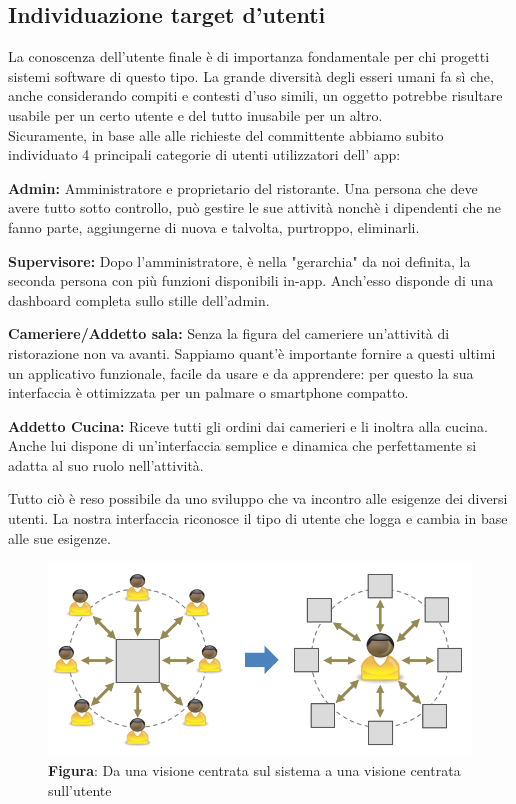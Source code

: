 \subsection{Individuazione target d'utenti}
    \begin{flushleft}
        La conoscenza dell'utente finale è di importanza fondamentale per chi progetti sistemi software di questo tipo. La grande diversità degli esseri umani
        fa sì che, anche considerando compiti e contesti d'uso simili, un oggetto potrebbe risultare usabile per un certo utente e
        del tutto inusabile per un altro.\\
        Sicuramente, in base alle alle richieste del committente abbiamo subito individuato 4 principali categorie di utenti utilizzatori dell' app:\vspace{0.5cm}
       
        \textbf{Admin:} Amministratore e proprietario del ristorante. Una persona che deve avere tutto sotto controllo, può gestire le sue attività nonchè i 
        dipendenti che ne fanno parte, aggiungerne di nuova e talvolta, purtroppo, eliminarli.\vspace{1cm}

        \textbf{Supervisore:} Dopo l'amministratore, è nella "gerarchia" da noi definita, la seconda persona con più funzioni disponibili in-app. 
        Anch'esso disponde di una dashboard completa sullo stille dell'admin.\vspace{1cm}

        \textbf{Cameriere/Addetto sala:} Senza la figura del cameriere un'attività di ristorazione non va avanti. Sappiamo quant'è importante fornire a questi ultimi
        un applicativo funzionale, facile da usare e da apprendere: per questo la sua interfaccia è ottimizzata per un palmare o smartphone compatto.\vspace{1cm}


        \textbf{Addetto Cucina:} Riceve tutti gli ordini dai camerieri e li inoltra alla cucina. Anche lui dispone di un'interfaccia semplice e dinamica che perfettamente si adatta al suo ruolo nell'attività.
        \vspace{0.5cm}

        
        
        Tutto ciò è reso possibile da uno sviluppo che va incontro alle esigenze dei diversi utenti. La nostra interfaccia riconosce il tipo di utente che logga e cambia
        in base alle sue esigenze. 

    \end{flushleft}


    \begin{figure}[H]
        \centering
        \includegraphics[scale=0.5]{assets/immagini varie/target utenti.png}
        \caption*{\textbf{Figura}: Da una visione centrata sul sistema a una visione centrata sull’utente}\label{fig:target_utenti}
    \end{figure}
        
